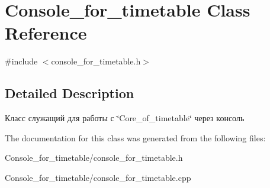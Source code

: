 \hypertarget{class_console__for__timetable}{}\section{Console\+\_\+for\+\_\+timetable Class Reference}
\label{class_console__for__timetable}


{\ttfamily \#include $<$console\+\_\+for\+\_\+timetable.\+h$>$}



\subsection{Detailed Description}
Класс служащий для работы с \char`\"{}\+Core\+\_\+of\+\_\+timetable\char`\"{} через консоль 

The documentation for this class was generated from the following files\+:\begin{DoxyCompactItemize}
\item 
Console\+\_\+for\+\_\+timetable/console\+\_\+for\+\_\+timetable.\+h\item 
Console\+\_\+for\+\_\+timetable/console\+\_\+for\+\_\+timetable.\+cpp\end{DoxyCompactItemize}
